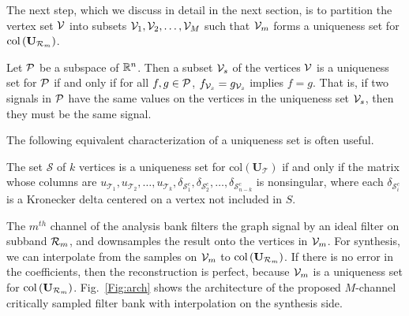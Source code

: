 \documentclass{article}
\begin{document}
The next step, which we discuss in detail in the next section, is to partition the vertex set ${\mathcal{V}}$ into subsets ${\mathcal{V}}_1,{\mathcal{V}}_2,\ldots,{\mathcal{V}}_M$ such that ${\mathcal{V}}_m$ forms a uniqueness set for $\mbox{col}\left(\mathbf{U}_{{\cal R}_m}\right)$.
\begin{definition}[Uniqueness set \cite{pesenson_paley}] 
Let ${\cal P}$ be a subspace of $\mathbb{R}^n$. 
Then a subset ${\mathcal{V}}_s$ of the vertices ${\mathcal{V}}$ is a uniqueness set for 
${\cal P}$ if  and only if for all %
$f,g \in {\cal P}$,
$f_{{\mathcal{V}}_s}=g_{{\mathcal{V}}_s}$ implies $f=g$. That is, if two signals in ${\cal P}$ have the same values on the vertices in the uniqueness set ${\mathcal{V}}_s$, then they must be the same signal.
\end{definition}
The following equivalent characterization of a uniqueness set is often useful.
\begin{lemma}\label{Le:eq_uniq}
The set $\mathcal{S}$ of $k$ vertices is a uniqueness set for $\mbox{col}({\mathbf{U}}_{\mathcal T})$ if and only if the matrix whose columns are $u_{{\mathcal T}_1},u_{{\mathcal T}_2},\ldots,u_{{\mathcal T}_k}, \delta_{{\mathcal{S}}^c_1}, \delta_{{\mathcal{S}}^c_2}, \ldots, \delta_{{\mathcal{S}}^c_{n-k}}$ is nonsingular,
where each $\delta_{{\mathcal{S}}^c_i}$ is a Kronecker delta centered on a vertex not included in $S$. 
\end{lemma}
The $m^{th}$ channel of the analysis %
bank %
filters the graph signal by an ideal %
filter on subband ${\cal R}_m$, and downsamples the result onto the vertices in ${\mathcal{V}}_m$. For synthesis, we can interpolate from the samples on ${\mathcal{V}}_m$ to $\mbox{col}\left(\mathbf{U}_{{\cal R}_m}\right)$. If there is no error in the coefficients, then the reconstruction is perfect, because ${\mathcal{V}}_m$ is a uniqueness set for $\mbox{col}\left(\mathbf{U}_{{\cal R}_m}\right)$. Fig.\ \ref{Fig:arch} shows the architecture of the proposed $M$-channel critically sampled filter bank with interpolation on the synthesis side.
\end{document}
